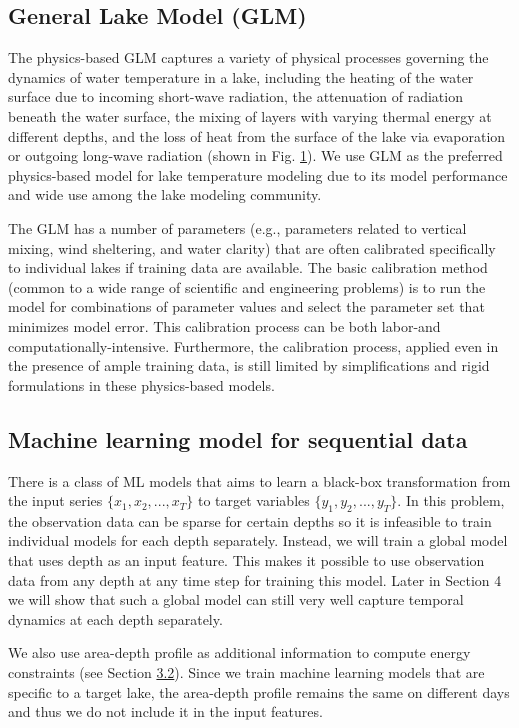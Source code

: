 \documentclass[book.tex]{subfiles}
\begin{document}
\subsection{General Lake Model (GLM)}

The physics-based GLM captures a variety of physical processes governing
the dynamics of water temperature in a lake, including the heating of
the water surface due to incoming short-wave radiation, the attenuation
of radiation beneath the water surface, the mixing of layers with
varying thermal energy at different depths, and the loss of heat from the
surface of the lake via evaporation or outgoing long-wave radiation
(shown in Fig. \protect\hyperlink{page5}{1}). We use GLM as the
preferred physics-based model for lake temperature modeling due to its
model performance and wide use among the lake modeling community.


The GLM has a number of parameters (e.g., parameters related to vertical
mixing, wind sheltering, and water clarity) that are often calibrated
specifically to individual lakes if training data are available. The
basic calibration method (common to a wide range of scientific and
engineering problems) is to run the model for combinations of parameter
values and select the parameter set that minimizes model error. This
calibration process can be both labor-and computationally-intensive.
Furthermore, the calibration process, applied even in the presence of
ample training data, is still limited by simplifications and rigid
formulations in these physics-based models.

\subsection{Machine learning model for sequential data}

There is a class of ML models that aims to learn a black-box
transformation from the input series $\{x_1, x_2, ..., x_T\}$ 
to target variables $\{y_1, y_2, ..., y_T\}$. In this problem,
the observation data can be sparse for certain depths so it is
infeasible to train individual models for each depth separately.
Instead, we will train a global model that uses depth as an input
feature. This makes it possible to use observation data from any depth at
any time step for training this model. Later in Section 4 we will show
that such a global model can still very well capture temporal dynamics
at each depth separately.

We also use area-depth profile as additional information to compute
energy constraints (see Section \protect\hyperlink{page7}{3.2}). Since
we train machine learning models that are specific to a target
lake, the area-depth profile remains the same on different days and
thus we do not include it in the input features.
\end{document}
